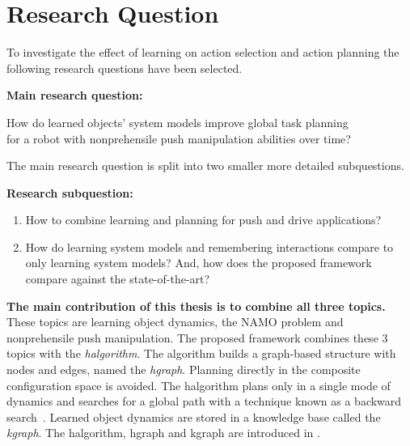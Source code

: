 \section{Research Question}%
\label{sec:research_question}
To investigate the effect of learning on action selection and action planning the following research questions have been selected.\bs

\textbf{Main research question:}
\begin{center}%
\label{researchquestion:main}
\large
How do learned objects' system models improve global task planning\\for a robot with nonprehensile push manipulation abilities over time?
\end{center}

The main research question is split into two smaller more detailed subquestions.\bs

\textbf{Research subquestion:}
\begin{enumerate}
    \item\label{researchsubquestion:does_it_work} How to combine learning and planning for push and drive applications?
    \item\label{researchsubquestion:does_it_compare} How do learning system models and remembering interactions compare to only learning system models? And, how does the proposed framework compare against the state-of-the-art?
\end{enumerate}

\textbf{The main contribution of this thesis is to combine all three topics.} These topics are learning object dynamics, the \ac{NAMO} problem and nonprehensile push manipulation. The proposed framework combines these 3 topics with the \textit{\acl{halgorithm}}. The algorithm builds a graph-based structure with nodes and edges, named the \textit{\acl{hgraph}}. Planning directly in the composite configuration space is avoided. The \acl{halgorithm} plans only in a single mode of dynamics and searches for a global path with a technique known as a backward search~\cite{krontiris_dealing_2015}. Learned object dynamics are stored in a knowledge base called the \textit{\acl{kgraph}}. The \ac{halgorithm}, \ac{hgraph} and \ac{kgraph} are introduced in .\bs

